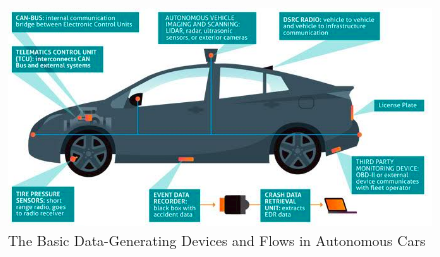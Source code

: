 \begin{figure}[h]
	\centering  	
	\includegraphics[width=13cm]{img/Sensors1.png}
	\caption{The Basic Data-Generating Devices and Flows in Autonomous Cars \cite{PicPrivacy}}
	\label{fig:Sensors}    
\end{figure}

